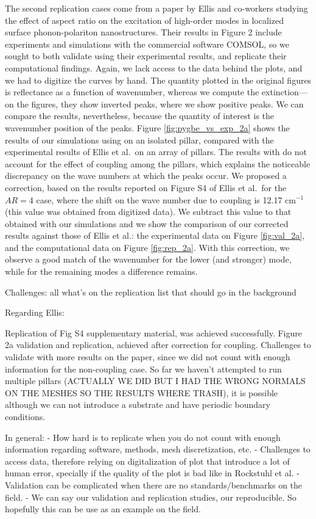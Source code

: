 The second replication cases come from a paper by Ellis and co-workers \cite{ellis2016} studying the effect of aspect ratio on the excitation of high-order modes in localized surface phonon-polariton nanostructures. 
Their results in Figure 2 include experiments and simulations with the commercial software COMSOL, so we sought to both validate \pygbe using their experimental results, and replicate their computational findings. 
Again, we lack access to the data behind the plots, and we had to digitize the curves by hand. 
The quantity plotted in the original figures is reflectance as a function of wavenumber, whereas we compute the extinction---on the figures, they show inverted peaks, where we show positive peaks.
We can compare the results, nevertheless, because the quantity of interest is the wavenumber position of the peaks.
Figure \ref{fig:pygbe_vs_exp_2a} shows the results of our simulations using \pygbe on an isolated pillar,
compared with the experimental results of Ellis et al.\ on an array of pillars.
The results with \pygbe  do not account for the effect of coupling among the pillars, which explains the noticeable discrepancy on the wave numbers at which the peaks occur. 
We proposed a correction, based on the results reported on Figure S4 of Ellis et al.\ for the $AR=4$ case, where the shift on the wave number due to coupling is 12.17 cm$^{-1}$ (this value was obtained from digitized data). 
We subtract this value to that obtained with our simulations and we show the comparison of our corrected results against those of Ellis et al.: the experimental data on Figure \ref{fig:val_2a}, and the
computational data on Figure \ref{fig:rep_2a}. 
With this correction, we observe a good match of the wavenumber for the lower (and stronger) mode, while for the remaining modes a difference remains.

Challenges: all what's on the replication list that should go in the background 

Regarding Ellis:

Replication of Fig S4 supplementary material, was achieved successfully. 
Figure 2a validation and replication, achieved after correction for coupling. 
Challenges to validate with more results on the paper, since we did not count with enough 
information for the non-coupling case. So far we haven't attempted to run multiple pillars 
(ACTUALLY WE DID BUT I HAD THE WRONG NORMALS ON THE MESHES SO THE RESULTS WHERE TRASH), it is possible although we can not
introduce a substrate and have periodic boundary conditions.  


In general:
- How hard is to replicate when you do not count with enough information regarding software, methods, mesh discretization, etc. 
- Challenges to access data, therefore relying on digitalization of plot that introduce a lot of human error, specially if the quality 
of the plot is bad like in Rockstuhl et al. 
- Validation can be complicated when there are no standards/benchmarks on the field.
- We can say our validation and replication studies, our reproducible. So hopefully this can be use as
 an example on the field. 